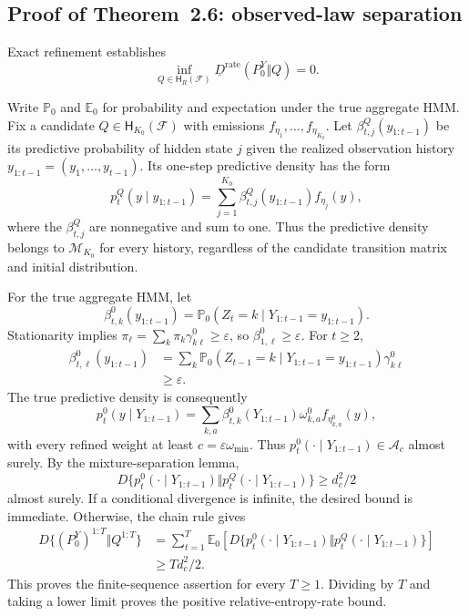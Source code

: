 \documentclass[11pt]{article}
\newcommand{\Pbb}{\mathbb{P}}
\newcommand{\Ebb}{\mathbb{E}}
\newcommand{\Fcal}{\mathcal{F}}
\newcommand{\Mcal}{\mathcal{M}}
\newcommand{\Acal}{\mathcal{A}}
\newcommand{\Hcal}{\mathsf{H}}
\begin{document}
\subsection{Proof of Theorem~2.6: observed-law separation}

Exact refinement establishes
\begin{equation*}
 \inf_{Q\in\Hcal_R(\Fcal)}
 \underline D^{\mathrm{rate}}(P_0^Y\Vert Q)=0.
\end{equation*}

Write $\Pbb_0$ and $\Ebb_0$ for probability and expectation under the true
aggregate HMM\@. Fix a candidate $Q\in\Hcal_{K_0}(\Fcal)$ with emissions
$f_{\eta_1},\ldots,f_{\eta_{K_0}}$. Let
$\beta^Q_{t,j}(y_{1:t-1})$ be its predictive probability of hidden state $j$
given the realized observation history
$y_{1:t-1}=(y_1,\ldots,y_{t-1})$. Its one-step predictive density has the form
\begin{equation*}
 p_t^Q(y\mid y_{1:t-1})
 =\sum_{j=1}^{K_0}\beta^Q_{t,j}(y_{1:t-1})f_{\eta_j}(y),
\end{equation*}
where the $\beta^Q_{t,j}$ are nonnegative and sum to one. Thus the predictive
density belongs to $\Mcal_{K_0}$ for every history, regardless of the candidate
transition matrix and initial distribution.

For the true aggregate HMM, let
\begin{equation*}
 \beta^0_{t,k}(y_{1:t-1})
 =\Pbb_0(Z_t=k\mid Y_{1:t-1}=y_{1:t-1}).
\end{equation*}
Stationarity implies
$\pi_\ell=\sum_k\pi_k\gamma^0_{k\ell}\geq\varepsilon$, so
$\beta^0_{1,\ell}\geq\varepsilon$. For $t\geq2$,
\begin{align*}
 \beta^0_{t,\ell}(y_{1:t-1})
 &=\sum_k\Pbb_0(Z_{t-1}=k\mid Y_{1:t-1}=y_{1:t-1})
 \gamma^0_{k\ell}\\
 &\geq\varepsilon.
\end{align*}
The true predictive density is consequently
\begin{equation*}
 p_t^0(y\mid Y_{1:t-1})
 =\sum_{k,a}\beta^0_{t,k}(Y_{1:t-1})\omega^0_{k,a}
 f_{\eta^0_{k,a}}(y),
\end{equation*}
with every refined weight at least $c=\varepsilon\omega_{\min}$. Thus
$p_t^0(\cdot\mid Y_{1:t-1})\in\Acal_c$ almost surely. By the
mixture-separation lemma,
\begin{equation*}
 D\{p_t^0(\cdot\mid Y_{1:t-1})\Vert
 p_t^Q(\cdot\mid Y_{1:t-1})\}\geq d_c^2/2
\end{equation*}
almost surely. If a conditional divergence is infinite, the desired bound is
immediate. Otherwise, the chain rule gives
\begin{align*}
 D\{(P_0^Y)^{1:T}\Vert Q^{1:T}\}
 &=\sum_{t=1}^T\Ebb_0\left[
 D\{p_t^0(\cdot\mid Y_{1:t-1})\Vert
 p_t^Q(\cdot\mid Y_{1:t-1})\}\right]\\
 &\geq Td_c^2/2.
\end{align*}
This proves the finite-sequence assertion for every $T\geq1$.
Dividing by $T$ and taking a lower limit proves the positive
relative-entropy-rate bound.
\end{document}
